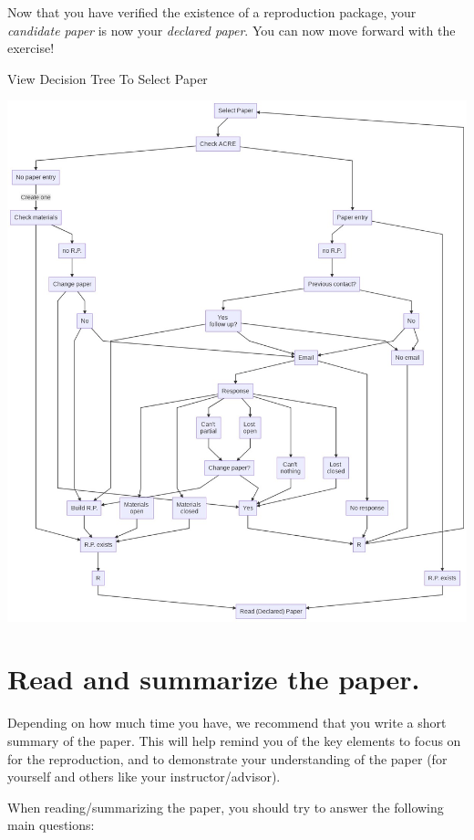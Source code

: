 \documentclass[]{book}
\begin{document}
Now that you have verified the existence of a reproduction package, your \emph{candidate paper} is now your \emph{declared paper}. You can now move forward with the exercise!

View Decision Tree To Select Paper

\includegraphics{candidate-paper.jpeg}

\hypertarget{read-sum}{%
\section{Read and summarize the paper.}\label{read-sum}}

Depending on how much time you have, we recommend that you write a short summary of the paper. This will help remind you of the key elements to focus on for the reproduction, and to demonstrate your understanding of the paper (for yourself and others like your instructor/advisor).

When reading/summarizing the paper, you should try to answer the following main questions:
\end{document}
